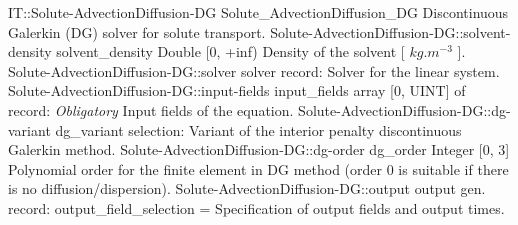 \begin{RecordType}
	{IT::Solute-AdvectionDiffusion-DG}
	{Solute{\_}AdvectionDiffusion{\_}DG}
	{}%
	{}%
	{{{Discontinuous Galerkin (DG) solver for solute transport.}%
}}
		\RecKey
			{Solute-AdvectionDiffusion-DG::solvent-density}
			{solvent{\_}density}
			{{Double [0, +inf)}}{}
			{ }
			{{{Density of the solvent [ }{$kg.m^{-3}$}{ ].}%
}}
		\RecKey
			{Solute-AdvectionDiffusion-DG::solver}
			{solver}
			{{record: }}{}
			{ \ValueDefault{{\{}{\}}}}
			{{{Solver for the linear system.}%
}}
		\RecKey
			{Solute-AdvectionDiffusion-DG::input-fields}
			{input{\_}fields}
			{{array [0, UINT] of }{record: }}{}
			{ \it{Obligatory}}
			{{{Input fields of the equation.}%
}}
		\RecKey
			{Solute-AdvectionDiffusion-DG::dg-variant}
			{dg{\_}variant}
			{{selection: }}{}
			{ }
			{{{Variant of the interior penalty discontinuous Galerkin method.}%
}}
		\RecKey
			{Solute-AdvectionDiffusion-DG::dg-order}
			{dg{\_}order}
			{{Integer [0, 3]}}{}
			{ }
			{{{Polynomial order for the finite element in DG method (order 0 is suitable if there is no diffusion/dispersion).}%
}}
		\RecKey
			{Solute-AdvectionDiffusion-DG::output}
			{output}
			{{gen. record: }}{{output{\_}field{\_}selection}{ = }}
			{ }
			{{{Specification of output fields and output times.}%
}}
\end{RecordType}
